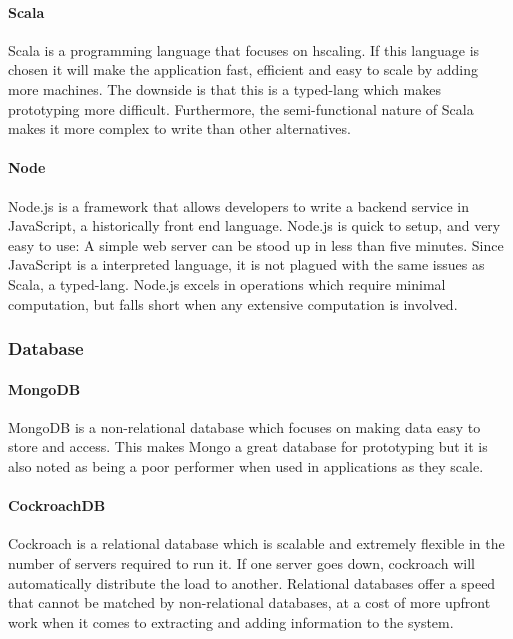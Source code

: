 \documentclass[11pt]{article}
\begin{document}
\paragraph{Scala}
\hfill \break

Scala is a programming language that focuses on \gls{hscaling}. If this language is chosen it will make the application fast, efficient and easy to scale by adding more machines. The downside is that this is a \gls{typed-lang} which makes prototyping more difficult. Furthermore, the semi-functional nature of Scala makes it more complex to write than other alternatives.

\paragraph{Node}
\hfill \break

Node.js is a framework that allows developers to write a \gls{backend} service in JavaScript, a historically front end language. Node.js is quick to setup, and very easy to use: A simple web server can be stood up in less than five minutes. Since JavaScript is a interpreted language, it is not plagued with the same issues as Scala, a \gls{typed-lang}. Node.js excels in operations which require minimal computation, but falls short when any extensive computation is involved.

\subsubsection{Database}

\paragraph{MongoDB}
\hfill \break

MongoDB is a \gls{non-relational} database which focuses on making data easy to store and access. This makes Mongo a great database for prototyping but it is also noted as being a poor performer when used in applications as they scale.

\paragraph{CockroachDB}
\hfill \break

Cockroach is a \gls{relational} database which is \gls{scalable} and extremely flexible in the number of servers required to run it. If one server goes down, cockroach will automatically distribute the load to another. Relational databases offer a speed that cannot be matched by non-relational databases, at a cost of more upfront work when it comes to extracting and adding information to the system.
\end{document}
